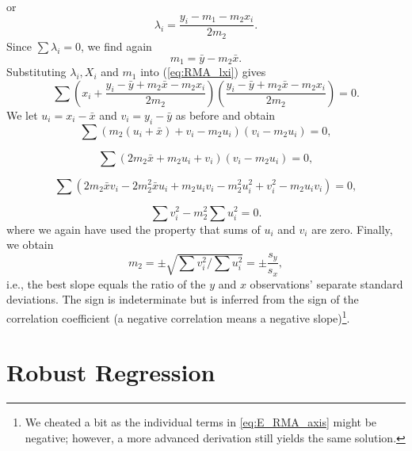 or			       
\begin{equation}
\lambda_i = \frac{y_i - m_1 - m_2 x_i}{2m_2}.
\end{equation}	 
Since $\sum \lambda_i = 0$, we find again
\begin{equation}
m_1 = \bar{y} - m_2 \bar{x}.
\end{equation}	 
Substituting $\lambda_i, X_i$ and $m_1$ into (\ref{eq:RMA_lxi}) gives
$$
\sum \left ( x_i + \frac{y_i - \bar{y} + m_2 \bar{x} - m_2 x_i}{2m_2} \right ) \left ( 
\frac{y_i - \bar{y} + m_2 \bar{x} - m_2 x_i}{2m_2} \right) = 0.
$$
We let $u_i = x_i - \bar{x}$ and $v_i = y_i - \bar{y}$ as before and obtain 
$$
\sum \left (m_2 (u_i + \bar{x} ) + v_i - m_2 u_i \right ) (v_i - m_2 u_i) = 0,
$$

$$
\sum (2m_2 \bar{x} + m_2 u_i + v_i) (v_i - m_2 u_i) = 0,
$$

$$
\sum (2m_2 \bar{x} v_i - 2m_2 ^2  \bar{x} u_i + m_2 u_i v_i - m_2^2 u^2_i + v^2_i - m_2 u_i v_i ) = 0,
$$

$$
\sum v^2_i - m_2^2 \sum u^2_i = 0.
$$
where we again have used the property that sums of $u_i$ and $v_i$ are zero.  Finally, we obtain
\begin{equation}
m_2 = \pm \sqrt{ \sum v^2_i / \sum u^2_i} = \pm \frac{s_y}{s_x},
\end{equation}
i.e., the best slope equals the ratio of the $y$ and $x$ observations' separate standard deviations.
The sign is indeterminate but is inferred from the sign of the correlation coefficient (a negative
correlation means a negative slope)\footnote{We cheated a bit as the individual terms in \ref{eq:E_RMA_axis}
might be negative; however, a more advanced derivation still yields the same solution.}.


\section{Robust Regression}

